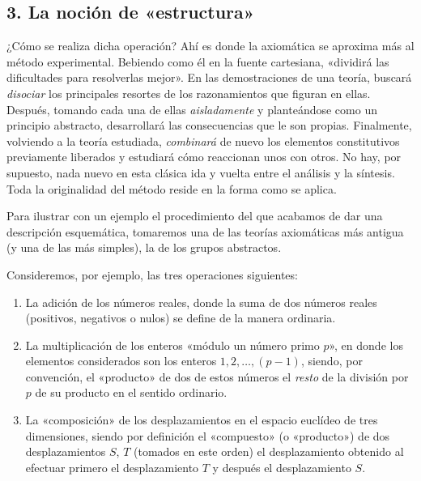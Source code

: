\documentclass[a4paper, 12pt, draft]{article}
\begin{document}
\subsection*{3. La noción de «estructura»}

¿Cómo se realiza dicha operación? Ahí es donde la axiomática se aproxima más al método experimental. Bebiendo como él en la fuente cartesiana, «dividirá las dificultades para resolverlas mejor». En las demostraciones de una teoría, buscará \textit{disociar} los principales resortes de los razonamientos que figuran en ellas. Después, tomando cada una de ellas \textit{aisladamente} y planteándose como un principio abstracto, desarrollará las consecuencias que le son propias. Finalmente, volviendo a la teoría estudiada, \textit{combinará} de nuevo los elementos constitutivos previamente liberados y estudiará cómo reaccionan unos con otros. No hay, por supuesto, nada nuevo en esta clásica ida y vuelta entre el análisis y la síntesis. Toda la originalidad del método reside en la forma como se aplica.

Para ilustrar con un ejemplo el procedimiento del que acabamos de dar una descripción esquemática, tomaremos una de las teorías axiomáticas más antigua (y una de las más simples), la de los \textsf{grupos abstractos}. 

 Consideremos, por ejemplo, las tres operaciones siguientes: 


\begin{enumerate}
\vspace{- 1em}

\item La adición de los números reales, donde la suma de dos números reales (positivos, negativos o nulos) se define de la manera ordinaria. 

\item La multiplicación de los enteros «módulo un número primo $p$», en donde los elementos considerados son los enteros $1, 2,\dots, (p-1)$, siendo, por convención, el «producto» de dos de estos números el \textit{resto} de la división por $p$ de su producto en el sentido ordinario.

\item La «composición» de los desplazamientos en el espacio euclídeo de tres dimensiones, siendo por definición el «compuesto» (o «pro\-duc\-to») de dos desplazamientos $S$, $T$ (tomados en este orden) el desplazamiento obtenido al efectuar primero el desplazamiento $T$ y después el desplazamiento $S$. 

\end{enumerate}
\end{document}
